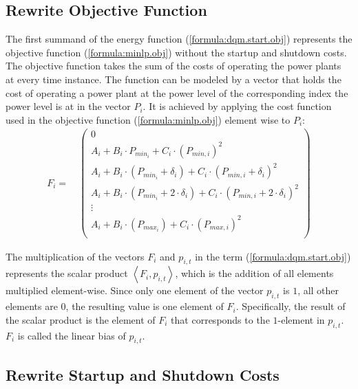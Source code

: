 \subsection{Rewrite Objective Function}

The first summand of the energy function (\ref{formula:dqm.start.obj}) represents the objective function (\ref{formula:minlp.obj}) without the startup and shutdown costs.
The objective function takes the sum of the costs of operating the power plants at every time instance.
The function can be modeled by a vector that holds the cost of operating a power plant at the power level of the corresponding index the power level is at in the vector $P_i$.
It is achieved by applying the cost function used in the objective function (\ref{formula:minlp.obj}) element wise to $P_i$:
\begin{align}
  F_i = \quad \begin{pmatrix}
    0 \\
    A_i + B_i \cdot P_{min_i} + C_i \cdot \left( P_{min, i} \right)^2 \\
    A_i + B_i \cdot \left( P_{min_i} + \delta_i \right) + C_i \cdot \left( P_{min, i} + \delta_i \right)^2 \\
    A_i + B_i \cdot \left( P_{min_i} + 2 \cdot \delta_i \right) + C_i \cdot \left( P_{min, i} + 2 \cdot \delta_i \right)^2 \\
    \vdots \\
    A_i + B_i \cdot \left( P_{max_i} \right) + C_i \cdot \left( P_{max, i} \right)^2 \\
  \end{pmatrix}
\end{align}

The multiplication of the vectors $F_i$ and $p_{i, t}$ in the term (\ref{formula:dqm.start.obj}) represents the scalar product $\left\langle F_i, p_{i, t} \right\rangle$, which is the addition of all elements multiplied element-wise.
Since only one element of the vector $p_{i, t}$ is $1$, all other elements are $0$, the resulting value is one element of $F_i$.
Specifically, the result of the scalar product is the element of $F_i$ that corresponds to the $1$-element in $p_{i, t}$.
$F_i$ is called the linear bias of $p_{i, t}$.

\subsection{Rewrite Startup and Shutdown Costs}
\label{approach:annealing.formulate.startup}

